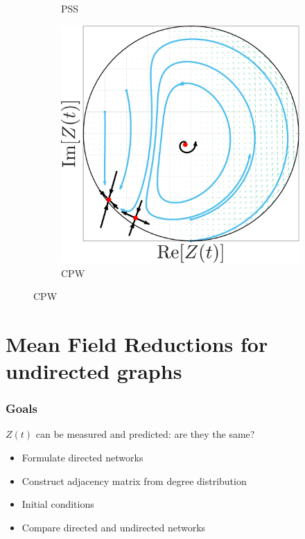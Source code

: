 \begin{frame}
\begin{figure}[H]
\begin{subfigure}[b]{0.32\linewidth}
  \caption{PSS}
   \label{fig:MFRPSS}
\end{subfigure} \hfill
\begin{subfigure}[b]{0.32\linewidth}
   \centering
  \includegraphics[width=\linewidth]{../Figures/PhaseSpace/MFRCPW.pdf}
    \caption{CPW}
   \label{fig:MFRCPW}
\end{subfigure}
   \label{fig:macroscopicstatesfixeddegree}
\end{figure}
\end{frame}

\section{\mywork Mean Field Reductions for undirected graphs} 
\begin{frame}
\frametitle{Goals} 
$Z(t)$ can be measured and predicted: are they the same? \\
\begin{itemize}
\item Formulate directed networks \\
\item Construct adjacency matrix from degree distribution \\
\item Initial conditions 
\item Compare directed and undirected networks
\end{itemize}
\end{frame}

